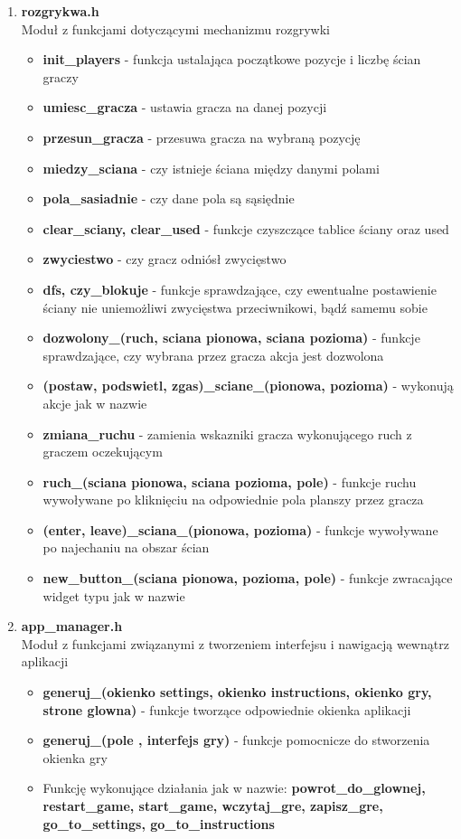 \documentclass{article}
\newcommand{\akapit}{\hspace{0.5cm}}
\newcommand{\g}[1]{\textbf{#1}}
\begin{document}
\begin{enumerate}
\begin{itemize}
			\end{itemize}
			\item \textbf{rozgrykwa.h} \\
			\akapit Moduł z funkcjami dotyczącymi mechanizmu rozgrywki
			\begin{itemize}
				\item \g{init\_players} - funkcja ustalająca początkowe pozycje i liczbę ścian graczy
				\item  \g{umiesc\_gracza} - ustawia gracza na danej pozycji
				\item \g{przesun\_gracza} - przesuwa gracza na wybraną pozycję
				\item \g{miedzy\_sciana} - czy istnieje ściana między danymi polami
				\item \g{pola\_sasiadnie} - czy dane pola są sąsiędnie
				\item \g{clear\_sciany, clear\_used} - funkcje czyszczące tablice ściany oraz used
				\item \g{zwyciestwo} - czy gracz odniósł zwycięstwo
				\item \g{dfs, czy\_blokuje} - funkcje sprawdzające, czy ewentualne postawienie 	ściany nie uniemożliwi zwycięstwa przeciwnikowi, bądź samemu sobie
				\item \g{dozwolony\_(ruch, sciana pionowa, sciana pozioma)} - funkcje 								sprawdzające, czy wybrana przez gracza akcja jest dozwolona
				\item \g{(postaw, podswietl, zgas)\_sciane\_(pionowa, pozioma)} - wykonują akcje jak w nazwie
				\item \g{zmiana\_ruchu} - zamienia wskazniki gracza wykonującego ruch z 								graczem oczekującym
				\item \g{ruch\_(sciana pionowa, sciana pozioma, pole)} - funkcje ruchu 								wywoływane po kliknięciu na odpowiednie pola planszy przez gracza
				\item \g{(enter, leave)\_sciana\_(pionowa, pozioma)} - funkcje wywoływane po najechaniu na obszar ścian
				\item \g{new\_button\_(sciana pionowa, pozioma, pole)} - funkcje zwracające 	widget typu jak w nazwie
			\end{itemize}
			\item \textbf{app\_manager.h} \\
			\akapit Moduł z funkcjami związanymi z tworzeniem interfejsu i nawigacją wewnątrz 					aplikacji
			\begin{itemize}
				\item \g{generuj\_(okienko settings, okienko instructions, okienko gry, 							strone glowna)} - funkcje tworzące odpowiednie okienka aplikacji
				\item \g{generuj\_(pole , interfejs gry)} - funkcje pomocnicze do stworzenia okienka gry
				\item Funkcję wykonujące działania jak w nazwie:\g{ powrot\_do\_glownej, restart\_game, start\_game, wczytaj\_gre, zapisz\_gre, go\_to\_settings, go\_to\_instructions}
			\end{itemize}
		\end{enumerate}
\end{document}
